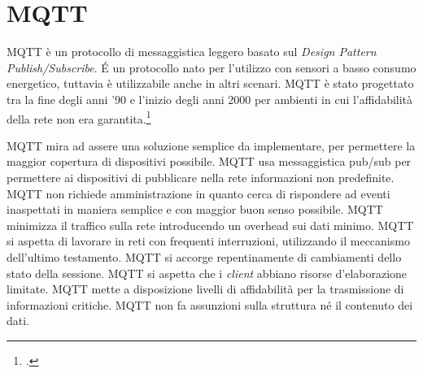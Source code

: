 

\section{MQTT}
\label{subsec:mqtt}
\gls{MQTT} è un protocollo di messaggistica leggero basato sul \emph{Design Pattern} \emph{Publish/Subscribe}.
É un protocollo nato per l'utilizzo con sensori a basso consumo energetico, tuttavia è utilizzabile anche in altri scenari.
MQTT è stato progettato tra la fine degli anni '90 e l'inizio degli anni 2000 per ambienti in cui l'affidabilità della rete non era garantita.\footcite{mqtt}

MQTT mira ad assere una soluzione semplice da implementare, per permettere la maggior copertura di dispositivi possibile.
MQTT usa messaggistica pub/sub per permettere ai dispositivi di pubblicare nella rete informazioni non predefinite.
MQTT non richiede amministrazione in quanto cerca di rispondere ad eventi inaspettati in maniera semplice e con maggior buon senso possibile.
MQTT minimizza il traffico sulla rete introducendo un \gls{overhead} sui dati minimo.
MQTT si aspetta di lavorare in reti con frequenti interruzioni, utilizzando il meccanismo dell'ultimo testamento.
MQTT si accorge repentinamente di cambiamenti dello stato della sessione.
MQTT si aspetta che i \emph{client} abbiano risorse d'elaborazione limitate.
MQTT mette a disposizione livelli di affidabilità per la trasmissione di informazioni critiche.
MQTT non fa assunzioni sulla struttura né il contenuto dei dati.

